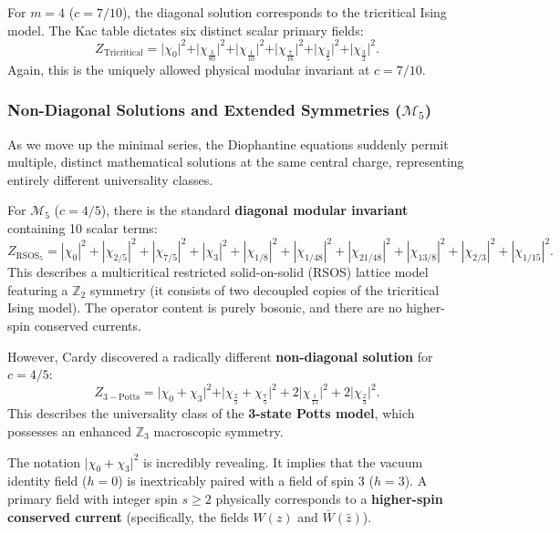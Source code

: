 \begin{example}
    For $m=4$ ($c=7/10$), the diagonal solution corresponds to the tricritical Ising model. The Kac table dictates six distinct scalar primary fields:
    \[
        Z_{\mathrm{Tricritical}} = \vert \chi_{0} \vert^2 + \vert \chi_{\frac{3}{80}} \vert^2 + \vert \chi_{\frac{1}{10}} \vert^2 + \vert \chi_{\frac{7}{16}} \vert^2 + \vert \chi_{\frac{3}{5}} \vert^2 + \vert \chi_{\frac{3}{2}} \vert^2.
    \]
    Again, this is the uniquely allowed physical modular invariant at $c=7/10$.
\end{example}

\subsubsection{Non-Diagonal Solutions and Extended Symmetries ($\mathcal{M}_5$)}

As we move up the minimal series, the Diophantine equations suddenly permit multiple, distinct mathematical solutions at the same central charge, representing entirely different universality classes.

For $\mathcal{M}_5$ ($c=4/5$), there is the standard \textbf{diagonal modular invariant} containing 10 scalar terms:
\[
    Z_{\mathrm{RSOS}_5} = |\chi_0|^2 + |\chi_{2/5}|^2 + |\chi_{7/5}|^2 + |\chi_{3}|^2 + |\chi_{1/8}|^2 + |\chi_{1/48}|^2 + |\chi_{21/48}|^2 + |\chi_{13/8}|^2 + |\chi_{2/3}|^2 + |\chi_{1/15}|^2.
\]
This describes a multicritical restricted solid-on-solid (RSOS) lattice model featuring a $\mathbb{Z}_2$ symmetry (it consists of two decoupled copies of the tricritical Ising model). The operator content is purely bosonic, and there are no higher-spin conserved currents.

However, Cardy discovered a radically different \textbf{non-diagonal solution} for $c=4/5$:
\[
    Z_{\mathrm{3-Potts}} = \vert \chi_0 + \chi_3 \vert^2 + \vert \chi_{\frac{2}{5}} + \chi_{\frac{7}{5}} \vert^2 + 2\vert \chi_{\frac{1}{15}} \vert^2 + 2\vert \chi_{\frac{2}{3}} \vert^2.
\]
This describes the universality class of the \textbf{3-state Potts model}, which possesses an enhanced $\mathbb{Z}_3$ macroscopic symmetry.

The notation $\vert \chi_0 + \chi_3 \vert^2$ is incredibly revealing. It implies that the vacuum identity field ($h=0$) is inextricably paired with a field of spin $3$ ($h=3$). A primary field with integer spin \(s\geq 2\) physically corresponds to a \textbf{higher-spin conserved current} (specifically, the fields $W(z)$ and $\bar{W}(\bar{z})$).

